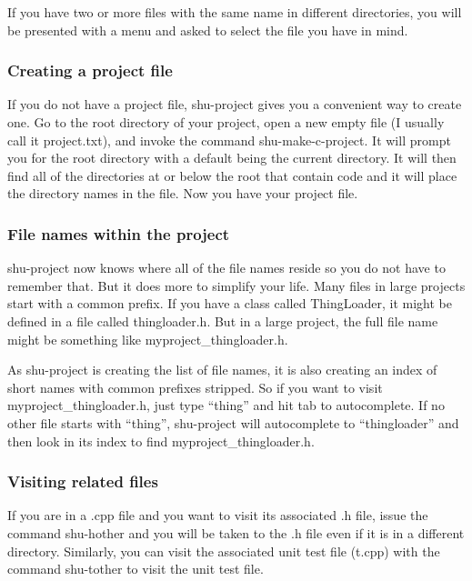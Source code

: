 If you have two or more files with the same name in different directories, you
will be presented with a menu and asked to select the file you have in mind.

\subsubsection{Creating a project file}

If you do not have a project file, shu-project gives you a convenient way to
create one.  Go to the root directory of your project, open a new empty file
(I usually call it project.txt), and invoke the command shu-make-c-project.
It will prompt you for the root directory with a default being the current
directory.  It will then find all of the directories at or below the root that
contain code and it will place the directory names in the file.  Now you have
your project file.

\subsubsection{File names within the project}

shu-project now knows where all of the file names reside so you do not have to
remember that.  But it does more to simplify your life.  Many files in large
projects start with a common prefix.  If you have a class called ThingLoader,
it might be defined in a file called thingloader.h.  But in a large project,
the full file name might be something like myproject\_thingloader.h.

As shu-project is creating the list of file names, it is also creating an
index of short names with common prefixes stripped.  So if you want to visit
myproject\_thingloader.h, just type ``thing'' and hit tab to autocomplete.  If
no other file starts with ``thing'', shu-project will autocomplete to
``thingloader'' and then look in its index to find myproject\_thingloader.h.

\subsubsection{Visiting related files}

If you are in a .cpp file and you want to visit its associated .h file, issue
the command shu-hother and you will be taken to the .h file even if it is in a
different directory.  Similarly, you can visit the associated unit test file
(t.cpp) with the command shu-tother to visit the unit test file.


